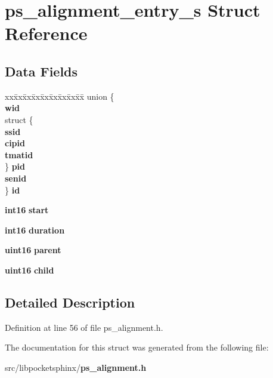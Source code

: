 \section{ps\-\_\-alignment\-\_\-entry\-\_\-s \-Struct \-Reference}
\label{structps__alignment__entry__s}
\subsection*{\-Data \-Fields}
\begin{DoxyCompactItemize}
\item 
\begin{tabbing}
xx\=xx\=xx\=xx\=xx\=xx\=xx\=xx\=xx\=\kill
union \{\\
 {\bfseries wid}\\
\>struct \{\\
\> {\bfseries ssid}\\
\> {\bfseries cipid}\\
\> {\bfseries tmatid}\\
\>\} {\bfseries pid}\\
 {\bfseries senid}\\
\} {\bfseries id}\label{structps__alignment__entry__s_a3c41870e66f6813e327a29c1d9b8d3bc}
\\

\end{tabbing}\item 
{\bf int16} {\bfseries start}\label{structps__alignment__entry__s_ac3b469463845542c8d29b7c6c4e0f29e}

\item 
{\bf int16} {\bfseries duration}\label{structps__alignment__entry__s_ad5559bb3e102d94e614d6b0357bda3ad}

\item 
{\bf uint16} {\bfseries parent}\label{structps__alignment__entry__s_aef8dfacf69640a3ff88514298aa8f54a}

\item 
{\bf uint16} {\bfseries child}\label{structps__alignment__entry__s_a5f8b29052c7257a83af07018dddb7eff}

\end{DoxyCompactItemize}


\subsection{\-Detailed \-Description}


\-Definition at line 56 of file ps\-\_\-alignment.\-h.



\-The documentation for this struct was generated from the following file\-:\begin{DoxyCompactItemize}
\item 
src/libpocketsphinx/{\bf ps\-\_\-alignment.\-h}\end{DoxyCompactItemize}
